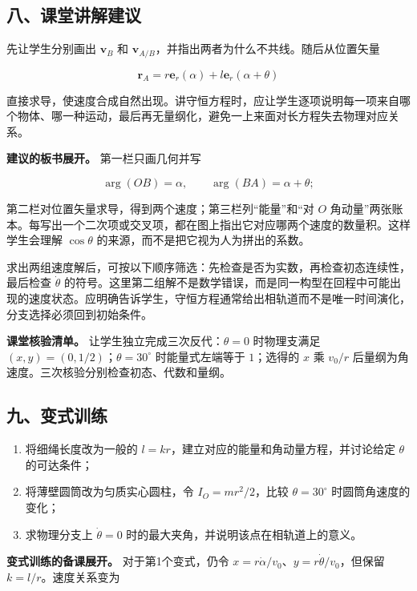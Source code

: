 \documentclass[12pt,a4paper,UTF8]{ctexart}
\newcommand{\tightlist}{\setlength{\itemsep}{0pt}\setlength{\parskip}{0pt}}
\begin{document}
\subsection{八、课堂讲解建议}\label{ux516bux8bfeux5802ux8bb2ux89e3ux5efaux8bae}

先让学生分别画出 \(\bm v_B\) 和
\(\bm v_{A/B}\)，并指出两者为什么不共线。随后从位置矢量

\[
\bm r_A=r\bm e_r(\alpha)+l\bm e_r(\alpha+\theta)
\]

直接求导，使速度合成自然出现。讲守恒方程时，应让学生逐项说明每一项来自哪个物体、哪一种运动，最后再无量纲化，避免一上来面对长方程失去物理对应关系。

\textbf{建议的板书展开。} 第一栏只画几何并写

\[
\arg(OB)=\alpha,
\qquad
\arg(BA)=\alpha+\theta;
\]

第二栏对位置矢量求导，得到两个速度；第三栏列``能量''和``对 \(O\)
角动量''两张账本。每写出一个二次项或交叉项，都在图上指出它对应哪两个速度的数量积。这样学生会理解
\(\cos\theta\) 的来源，而不是把它视为人为拼出的系数。

求出两组速度解后，可按以下顺序筛选：先检查是否为实数，再检查初态连续性，最后检查
\(\dot\theta\)
的符号。这里第二组解不是数学错误，而是同一构型在回程中可能出现的速度状态。应明确告诉学生，守恒方程通常给出相轨道而不是唯一时间演化，分支选择必须回到初始条件。

\textbf{课堂核验清单。} 让学生独立完成三次反代：\(\theta=0\)
时物理支满足 \((x,y)=(0,1/2)\)；\(\theta=30^\circ\) 时能量式左端等于
\(1\)；选得的 \(x\) 乘 \(v_0/r\)
后量纲为角速度。三次核验分别检查初态、代数和量纲。

\subsection{九、变式训练}\label{ux4e5dux53d8ux5f0fux8badux7ec3}

\begin{enumerate}
\def\labelenumi{\arabic{enumi}.}
\tightlist
\item
  将细绳长度改为一般的 \(l=kr\)，建立对应的能量和角动量方程，并讨论给定
  \(\theta\) 的可达条件；
\item
  将薄壁圆筒改为匀质实心圆柱，令 \(I_O=mr^2/2\)，比较
  \(\theta=30^\circ\) 时圆筒角速度的变化；
\item
  求物理分支上 \(\dot\theta=0\)
  时的最大夹角，并说明该点在相轨道上的意义。
\end{enumerate}

\textbf{变式训练的备课展开。} 对于第1个变式，仍令
\(x=r\dot\alpha/v_0\)、\(y=r\dot\theta/v_0\)，但保留
\(k=l/r\)。速度关系变为
\end{document}
